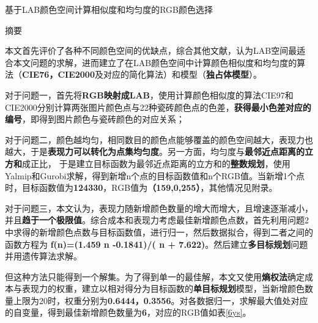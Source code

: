 \documentclass{article}
\begin{document}

	\begin{center}
	\LARGE 基于LAB颜色空间计算相似度和均匀度的RGB颜色选择
    \end{center}
	\large

    \par
	\begin{center}
		\Large{摘要}
  \end{center}

	本文首先评价了各种不同颜色空间的优缺点，综合其他文献，认为LAB空间最适合本文问题的求解，进而建立了在LAB颜色空间中计算颜色相似度和均匀度的算法（\textbf{CIE76，CIE2000}及对应的简化算法）和模型（\textbf{独占体模型}）。
	\\
	\par
	
	对于问题一，首先将\textbf{RGB映射成LAB}，使用计算颜色相似度的算法CIE97和CIE2000分别计算两张图片颜色点与22种瓷砖颜色点的色差，\textbf{获得最小色差对应的编号}，即得到图片颜色与瓷砖颜色的对应关系；
	\\
	\par
	
	对于问题二，颜色越均匀，相同数目的颜色点能够覆盖的颜色空间越大，表现力也越大，于是\textbf{表现力可以转化为点集均匀度}。另一方面，均匀度与\textbf{最邻近点距离的立方和}成正比，
	于是建立目标函数为最邻近点距离的立方和的\textbf{整数规划}，使用Yalmip和Gurobi求解，得到新增n个点的目标函数值和n个RGB值。当新增1个点时，目标函数值为\textbf{124330}，RGB值为\textbf{（159,0,255）}，其他情况见附录。	
	\\
	\par

	对于问题三，本文认为，表现力随新增颜色数量的增大而增大，且增速逐渐减小，并且\textbf{趋于一个极限值}。综合成本和表现力考虑最佳新增颜色点数，首先利用问题2中求得的新增颜色点数与目标函数值，进行归一，然后数据拟合，得到二者之间的函数方程为\textbf{ f(n)=(1.459 n -0.1841)/( n + 7.622)}。然后建立\textbf{多目标规划}问题并用遗传算法求解。
	
	但这种方法只能得到一个解集。为了得到单一的最佳解，本文又使用\textbf{熵权法}确定成本与表现力的权重，建立以相对得分为目标函数的\textbf{单目标规划}模型，当新增颜色数量上限为20时，权重分别为\textbf{0.6444，0.3556}。对各数据归一，求解最大值处对应的自变量，得到最佳新增颜色数量为\textbf{6}，对应的RGB值如表\ref{6ys}。
	\\
	\par
	
\end{document}
